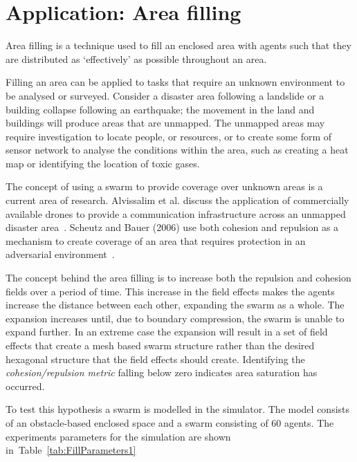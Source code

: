 \documentclass{ieeeaccess}
\begin{document}
\section{Application: Area filling}\label{Section:ApplicationFloodFilling}

Area filling is a technique used to fill an enclosed area with agents such that they are distributed as `effectively' as possible throughout an area. 

Filling an area can be applied to tasks that require an unknown environment to be analysed or surveyed. Consider a disaster area following a landslide or a building collapse following an earthquake; the movement in the land and buildings will produce areas that are unmapped. The unmapped areas may require investigation to locate people, or resources, or to create some form of sensor network to analyse the conditions within the area, such as creating a heat map or identifying the location of toxic gases. 

The concept of using a swarm to provide coverage over unknown areas is a current area of research. Alvissalim et al. discuss the application of commercially available drones to provide a communication infrastructure across an unmapped disaster area~\cite{AZHMJJM:12}. Scheutz and Bauer (2006) use both cohesion and repulsion as a mechanism to create coverage of an area that requires protection in an adversarial environment~\cite{SB:06}.

The concept behind the area filling is to increase both the repulsion and cohesion fields over a period of time. This increase in the field effects makes the agents increase the distance between each other, expanding the swarm as a whole. The expansion increases until, due to boundary compression, the swarm is unable to expand further. In an extreme case the expansion will result in a set of field effects that create a mesh based swarm structure rather than the desired hexagonal structure that the field effects should create. Identifying the \textit{cohesion/repulsion metric} falling below zero indicates area saturation has occurred.

To test this hypothesis a swarm is modelled in the simulator. The model consists of an obstacle-based enclosed space and a swarm consisting of 60 agents. The experiments parameters for the simulation are shown in~Table~\ref{tab:FillParameters1}
\end{document}

